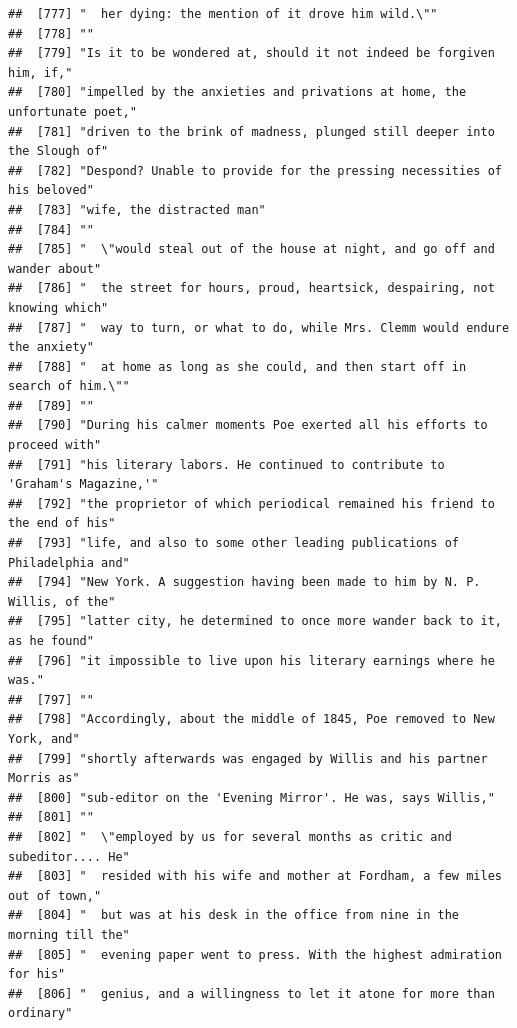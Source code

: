 \documentclass{article}\usepackage[]{graphicx}\usepackage[]{color}
\makeatletter
\newenvironment{kframe}{%
 \def\at@end@of@kframe{}%
 \ifinner\ifhmode%
  \def\at@end@of@kframe{\end{minipage}}%
  \begin{minipage}{\columnwidth}%
 \fi\fi%
 \def\FrameCommand##1{\hskip\@totalleftmargin \hskip-\fboxsep
 \colorbox{shadecolor}{##1}\hskip-\fboxsep
     \hskip-\linewidth \hskip-\@totalleftmargin \hskip\columnwidth}%
 \MakeFramed {\advance\hsize-\width
   \@totalleftmargin\z@ \linewidth\hsize
   \@setminipage}}%
 {\par\unskip\endMakeFramed%
 \at@end@of@kframe}
\newenvironment{knitrout}{}{} %
\makeatother
\begin{document}
\begin{knitrout}
\begin{kframe}
\begin{verbatim}
##  [777] "  her dying: the mention of it drove him wild.\""                            
##  [778] ""                                                                            
##  [779] "Is it to be wondered at, should it not indeed be forgiven him, if,"          
##  [780] "impelled by the anxieties and privations at home, the unfortunate poet,"     
##  [781] "driven to the brink of madness, plunged still deeper into the Slough of"     
##  [782] "Despond? Unable to provide for the pressing necessities of his beloved"      
##  [783] "wife, the distracted man"                                                    
##  [784] ""                                                                            
##  [785] "  \"would steal out of the house at night, and go off and wander about"      
##  [786] "  the street for hours, proud, heartsick, despairing, not knowing which"     
##  [787] "  way to turn, or what to do, while Mrs. Clemm would endure the anxiety"     
##  [788] "  at home as long as she could, and then start off in search of him.\""      
##  [789] ""                                                                            
##  [790] "During his calmer moments Poe exerted all his efforts to proceed with"       
##  [791] "his literary labors. He continued to contribute to 'Graham's Magazine,'"     
##  [792] "the proprietor of which periodical remained his friend to the end of his"    
##  [793] "life, and also to some other leading publications of Philadelphia and"       
##  [794] "New York. A suggestion having been made to him by N. P. Willis, of the"      
##  [795] "latter city, he determined to once more wander back to it, as he found"      
##  [796] "it impossible to live upon his literary earnings where he was."              
##  [797] ""                                                                            
##  [798] "Accordingly, about the middle of 1845, Poe removed to New York, and"         
##  [799] "shortly afterwards was engaged by Willis and his partner Morris as"          
##  [800] "sub-editor on the 'Evening Mirror'. He was, says Willis,"                    
##  [801] ""                                                                            
##  [802] "  \"employed by us for several months as critic and subeditor.... He"        
##  [803] "  resided with his wife and mother at Fordham, a few miles out of town,"     
##  [804] "  but was at his desk in the office from nine in the morning till the"       
##  [805] "  evening paper went to press. With the highest admiration for his"          
##  [806] "  genius, and a willingness to let it atone for more than ordinary"          

\end{verbatim}
\end{kframe}
\end{knitrout}
\end{document}
